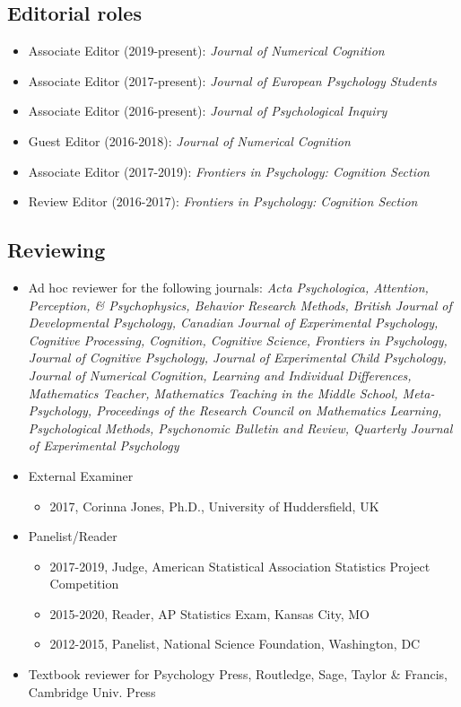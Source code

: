 \documentclass[article,10pt]{article}
\begin{document}
\subsection*{Editorial roles}
\label{sec:orgd9be94e}
\begin{itemize}
\item Associate Editor (2019-present): \emph{Journal of Numerical Cognition}
\item Associate Editor (2017-present): \emph{Journal of European Psychology Students}
\item Associate Editor (2016-present): \emph{Journal of Psychological Inquiry}
\item Guest Editor (2016-2018): \emph{Journal of Numerical Cognition}
\item Associate Editor (2017-2019): \emph{Frontiers in Psychology: Cognition Section}
\item Review Editor (2016-2017): \emph{Frontiers in Psychology: Cognition Section}
\end{itemize}
\subsection*{Reviewing}
\label{sec:orga424edc}

\begin{itemize}
\item Ad hoc reviewer for the following journals: \emph{Acta Psychologica, Attention, Perception, \& Psychophysics, Behavior Research Methods, British Journal of Developmental Psychology, Canadian Journal of Experimental Psychology, Cognitive Processing, Cognition, Cognitive Science, Frontiers in Psychology, Journal of Cognitive Psychology, Journal of Experimental Child Psychology, Journal of Numerical Cognition, Learning and Individual Differences, Mathematics Teacher, Mathematics Teaching in the Middle School, Meta-Psychology, Proceedings of the Research Council on Mathematics Learning, Psychological Methods, Psychonomic Bulletin and Review, Quarterly Journal of Experimental Psychology}
\item External Examiner
\begin{itemize}
\item 2017, Corinna Jones, Ph.D., University of Huddersfield, UK
\end{itemize}
\item Panelist/Reader
\begin{itemize}
\item 2017-2019, Judge, American Statistical Association Statistics Project Competition
\item 2015-2020, Reader, AP Statistics Exam, Kansas City, MO
\item 2012-2015, Panelist, National Science Foundation, Washington, DC
\end{itemize}

\item Textbook reviewer for Psychology Press, Routledge, Sage, Taylor \& Francis, Cambridge Univ. Press
\end{itemize}
\end{document}
